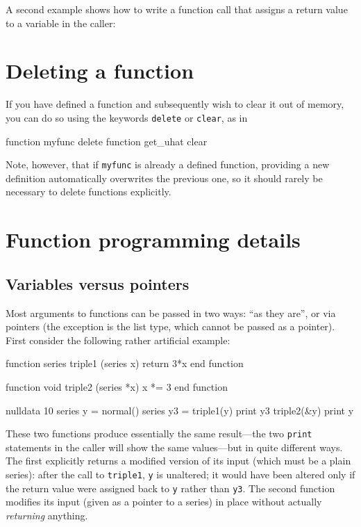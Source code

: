 A second example shows how to write a function call that assigns
a return value to a variable in the caller:
    
\section{Deleting a function}
\label{func-del}

If you have defined a function and subsequently wish to clear it out
of memory, you can do so using the keywords \texttt{delete} or
\texttt{clear}, as in

\begin{code}
function myfunc delete
function get_uhat clear
\end{code}

Note, however, that if \texttt{myfunc} is already a defined function,
providing a new definition automatically overwrites the previous one,
so it should rarely be necessary to delete functions explicitly.

\section{Function programming details}
\label{func-details}

\subsection{Variables versus pointers}
\label{sec:funscope}

Most arguments to functions can be passed in two ways: ``as they
are'', or via pointers (the exception is the list type, which cannot
be passed as a pointer). First consider the following rather
artificial example:
\begin{code}
function series triple1 (series x)
  return 3*x
end function
  
function void triple2 (series *x)
  x *= 3
end function

nulldata 10
series y = normal()
series y3 = triple1(y)
print y3
triple2(&y)
print y
\end{code}

These two functions produce essentially the same result---the two
\texttt{print} statements in the caller will show the same
values---but in quite different ways. The first explicitly returns a
modified version of its input (which must be a plain series): after
the call to \texttt{triple1}, \texttt{y} is unaltered; it would have
been altered only if the return value were assigned back to \texttt{y}
rather than \texttt{y3}. The second function modifies its input (given
as a pointer to a series) in place without actually \textit{returning}
anything.

